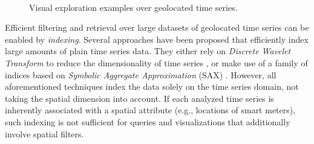 \begin{figure}[!tb]
 \centering
 \
\caption{Visual exploration examples over geolocated time series.}
\label{fig:examples}
\end{figure}

Efficient filtering and retrieval over large datasets of geolocated time series can be enabled by {\em indexing}. Several approaches have been proposed that efficiently index large amounts of plain time series data. They either rely on \emph{Discrete Wavelet Transform} to reduce the dimensionality of time series \cite{chan1999icde}, or make use of a family of indices based on \emph{Symbolic Aggregate Approximation} (SAX) \cite{shieh2008kdd,camerra2010icdm,camerra2014kais,zoumpatianos2014sigmod}. However, all aforementioned techniques index the data solely on the time series domain, not taking the spatial dimension into account. If each analyzed time series is inherently associated with a spatial attribute (e.g., locations of smart meters), such indexing is not sufficient for queries and visualizations that additionally involve spatial filters.

